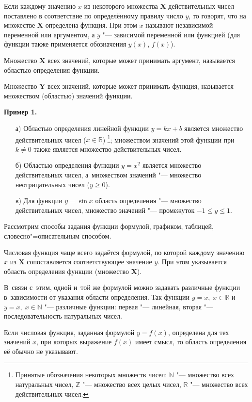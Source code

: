Если каждому значению $x$ из некоторого множества $\mathbf{X}$ действительных чисел
поставлено в соответствие по определённому правилу число $y$,
то говорят, что на множестве $\mathbf{X}$ определена функция.
При этом $x$ называют независимой переменной или аргументом,
а $y$ "--- зависимой переменной или функцией
(для функции также применяется обозначения $y(x)$, $f(x)$).

Множество $\mathbf{X}$ всех значений, которые может принимать аргумент,
называется областью определения функции.

Множество $\mathbf{Y}$ всех значений, которые может принимать функция,
называется множеством (областью) значений функции.

\textbf{Пример 1.}
\begin{itemize}
\item[а)] Областью определения линейной функции $y = kx+b$ является множество
действительных чисел ($x \in \mathbb{R}$)
\footnote{Принятые обозначения некоторых множеств чисел:
$\mathbb{N}$ "--- множество всех натуральных чисел,
$\mathbb{Z}$ "--- множество всех целых чисел,
$\mathbb{R}$ "--- множество всех действительных чисел.};
множеством значений этой функции при $k \ne 0$ также является множество
действительных чисел.
\item[б)] Областью определения функции $y=x^{2}$ является множество действительных
чисел, а~множеством значений "--- множество неотрицательных чисел
($y \geqslant 0$).
\item[в)] Для функции $y=\sin x$ область определения "--- множество действительных
чисел, множество значений "--- промежуток $-1 \leqslant y \leqslant 1$.
\end{itemize}

Рассмотрим способы задания функции формулой, графиком, таблицей,
словесно"=описательным способом.

Числовая функция чаще всего задаётся формулой, по которой каждому значению $x$
из $\mathbf{X}$ сопоставляется соответствующее значение $y$.
При этом указывается область определения функции (множество $\mathbf{X}$).

В~связи с~этим, одной и~той же формулой можно задавать различные функции
в~зависимости от указания области определения.
Так функции \mbox{$y=x, \; x \in \mathbb{R}$}
и~\mbox{$y=x, \; x \in \mathbb{N}$} "--- различные функции:
первая "--- линейная, вторая "--- последовательность натуральных чисел.

Если числовая функция, заданная формулой $y=f(x)$, определена
для тех значений $x$, при которых выражение $f(x)$ имеет смысл,
то область определения её обычно не указывают.

